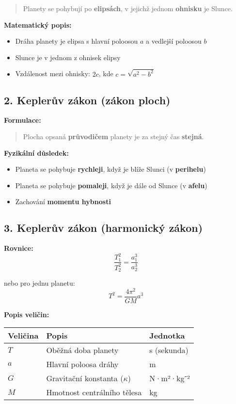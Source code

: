 \documentclass[11pt,a4paper]{article}
\begin{document}
\begin{quote}
Planety se pohybují po \textbf{elipsách}, v jejichž jednom \textbf{ohnisku} je Slunce.
\end{quote}

\textbf{Matematický popis:}

\begin{itemize}
\item Dráha planety je elipsa s hlavní poloosou $a$ a vedlejší poloosou $b$
\item Slunce je v jednom z ohnisek elipsy
\item Vzdálenost mezi ohnisky: $2c$, kde $c = \sqrt{a^2 - b^2}$
\end{itemize}

\subsection{2. Keplerův zákon (zákon ploch)}

\textbf{Formulace:}

\begin{quote}
Plocha opsaná \textbf{průvodičem} planety je za stejný čas \textbf{stejná}.
\end{quote}

\textbf{Fyzikální důsledek:}

\begin{itemize}
\item Planeta se pohybuje \textbf{rychleji}, když je blíže Slunci (v \textbf{perihelu})
\item Planeta se pohybuje \textbf{pomaleji}, když je dále od Slunce (v \textbf{afelu})
\item Zachování \textbf{momentu hybnosti}
\end{itemize}

\subsection{3. Keplerův zákon (harmonický zákon)}

\textbf{Rovnice:}
\[\frac{T_1^2}{T_2^2} = \frac{a_1^3}{a_2^3}\]

nebo pro jednu planetu:
\[T^2 = \frac{4\pi^2}{GM} a^3\]

\textbf{Popis veličin:}

\begin{longtable}{lll}
\toprule
Veličina & Popis & Jednotka \\
\midrule
$T$ & Oběžná doba planety & s (sekunda) \\
$a$ & Hlavní poloosa dráhy & m \\
$G$ & Gravitační konstanta ($\kappa$) & N·m²·kg⁻² \\
$M$ & Hmotnost centrálního tělesa & kg \\
\bottomrule
\end{longtable}
\end{document}

